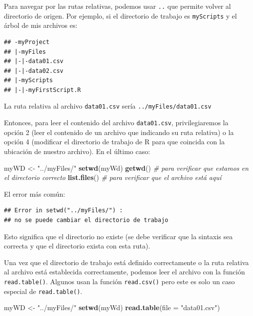 \documentclass[
]{book}
\newenvironment{Shaded}{\begin{snugshade}}{\end{snugshade}}
\newcommand{\CommentTok}[1]{\textcolor[rgb]{0.56,0.35,0.01}{\textit{#1}}}
\newcommand{\DataTypeTok}[1]{\textcolor[rgb]{0.13,0.29,0.53}{#1}}
\newcommand{\KeywordTok}[1]{\textcolor[rgb]{0.13,0.29,0.53}{\textbf{#1}}}
\newcommand{\NormalTok}[1]{#1}
\newcommand{\StringTok}[1]{\textcolor[rgb]{0.31,0.60,0.02}{#1}}
\begin{document}
Para navegar por las rutas relativas, podemos usar \texttt{..} que permite volver al directorio de origen. Por ejemplo, si el directorio de trabajo es \texttt{myScripts} y el árbol de mis archivos es:

\begin{verbatim}
## -myProject
## |-myFiles
## |-|-data01.csv
## |-|-data02.csv
## |-myScripts
## |-|-myFirstScript.R
\end{verbatim}

La ruta relativa al archivo \texttt{data01.csv} sería \texttt{../myFiles/data01.csv}

Entonces, para leer el contenido del archivo \texttt{data01.csv}, privilegiaremos la opción 2 (leer el contenido de un archivo que indicando su ruta relativa) o la opción 4 (modificar el directorio de trabajo de R para que coincida con la ubicación de nuestro archivo). En el último caso:

\begin{Shaded}
\begin{Highlighting}[]
\NormalTok{myWD <-}\StringTok{ "../myFiles/"}
\KeywordTok{setwd}\NormalTok{(myWd)}
\KeywordTok{getwd}\NormalTok{() }\CommentTok{# para verificar que estamos en el directorio correcto}
\KeywordTok{list.files}\NormalTok{() }\CommentTok{# para verificar que el archivo está aquí}
\end{Highlighting}
\end{Shaded}

El error más común:

\begin{verbatim}
## Error in setwd("../myFiles/") : 
## no se puede cambiar el directorio de trabajo
\end{verbatim}

Esto significa que el directorio no existe (se debe verificar que la sintaxis sea correcta y que el directorio exista con esta ruta).

Una vez que el directorio de trabajo está definido correctamente o la ruta relativa al archivo está establecida correctamente, podemos leer el archivo con la función \texttt{read.table()}. Algunos usan la función \texttt{read.csv()} pero este es solo un caso especial de \texttt{read.table()}.

\begin{Shaded}
\begin{Highlighting}[]
\NormalTok{myWD <-}\StringTok{ "../myFiles/"}
\KeywordTok{setwd}\NormalTok{(myWd)}
\KeywordTok{read.table}\NormalTok{(}\DataTypeTok{file =} \StringTok{"data01.csv"}\NormalTok{)}
\end{Highlighting}
\end{Shaded}
\end{document}
